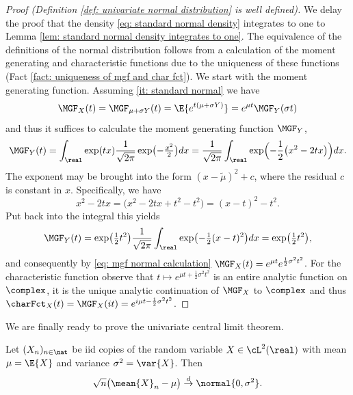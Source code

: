 \begin{proof}[Proof (Definition \ref{def: univariate normal distribution} is well defined)]
    We delay the proof that the density \eqref{eq: standard normal density} integrates to one
    to Lemma \ref{lem: standard normal density integrates to one}. The equivalence of the definitions of the
    normal distribution follows from a calculation of the moment generating and
    characteristic functions due to the uniqueness of these functions (Fact
    \ref{fact: uniqueness of mgf and char fct}). We start with the moment
    generating function. Assuming \ref{it: standard
    normal} we have
    \begin{equation}
        \label{eq: mgf normal calculation}    
        \MGF_X(t) = \MGF_{\mu + \sigma Y}(t) = \E{e^{t(\mu + \sigma Y)}} = e^{\mu t}\MGF_Y(\sigma t)
    \end{equation}
    and thus it suffices to calculate the moment generating function \(\MGF_Y\),
    \[
        \MGF_Y(t)
        = \int_\real \exp(tx) \frac1{\sqrt{2\pi}}
        \exp\bigl(-\tfrac{x^2}{2}\bigr) dx
        = \frac1{\sqrt{2\pi}} \int_\real
        \exp\Bigl(-\frac1{2}\bigl(x^2 - 2 tx\bigr)\Bigr) dx.
    \]
    The exponent may be brought into the form \((x-\tilde{\mu})^2 +
    c\), where the residual \(c\) is constant in \(x\).
    Specifically, we have
    \[
        x^2 - 2 tx
        = \bigl(x^2 - 2 t x + t^2 - t^2\bigr)
        = (x - t)^2 - t^2.
    \]
    Put back into the integral this yields
    \[
        \MGF_Y(t)
        = \exp\bigl(\tfrac12 t^2\bigr)
        \frac1{\sqrt{2\pi}} \int_\real
        \exp\bigl(-\tfrac1{2}(x - t)^2\bigr) dx
        = \exp\bigl(\tfrac12 t^2\bigr),
    \]
    and consequently by \eqref{eq: mgf normal calculation} \(\MGF_X(t) = e^{\mu t} e^{\frac12 \sigma^2 t^2}\).
    For the characteristic function observe that \(t\mapsto e^{\mu t + \frac12
    \sigma^2 t^2}\) is an entire analytic function on \(\complex\), it is the
    unique analytic continuation of \(\MGF_X\) to \(\complex\) and thus
    \(\charFct_X(t) = \MGF_X(it) = e^{i \mu t - \frac12 \sigma^2 t^2}\).
\end{proof}

We are finally ready to prove the univariate central limit theorem.

\begin{mdframed}[innertopmargin=0pt]
\begin{theorem}
    \label{thm: univariate central limit theorem}
    Let \((X_n)_{n\in \nat}\) be iid copies of the random variable \(X\in
    \cL^2(\real)\) with mean \(\mu = \E{X}\) and variance \(\sigma^2 =
    \var{X}\). Then
    \[
        \sqrt{n}\bigl(\mean{X}_n - \mu\bigr)
        \overset{d}\to \normal{0, \sigma^2}.
    \]
\end{theorem}
\end{mdframed}

